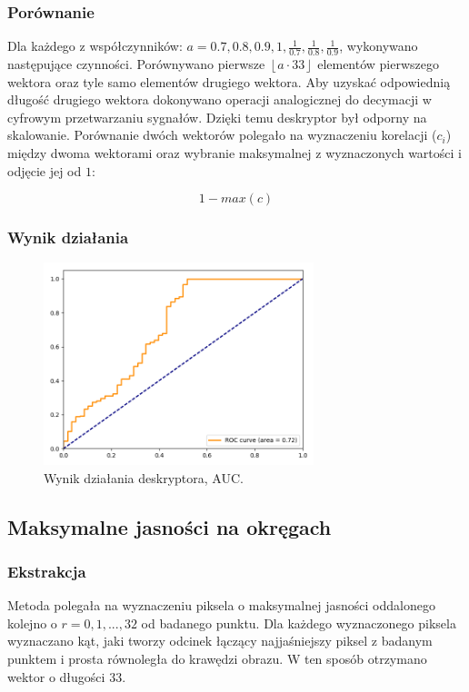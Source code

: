 \documentclass[a4paper,11pt]{article}
\begin{document}
\subsubsection{Porównanie}
Dla każdego z współczynników: $a = 0.7, 0.8, 0.9, 1, \frac{1}{0.7}, \frac{1}{0.8}, \frac{1}{0.9}$, wykonywano następujące czynności.
Porównywano pierwsze $\left \lfloor  a \cdot 33 \right \rfloor$ elementów pierwszego wektora oraz tyle samo elementów drugiego wektora. Aby uzyskać odpowiednią długość drugiego wektora dokonywano operacji analogicznej do decymacji w cyfrowym przetwarzaniu sygnałów.
Dzięki temu deskryptor był odporny na skalowanie.
Porównanie dwóch wektorów polegało na wyznaczeniu korelacji ($c_i$) między dwoma wektorami oraz wybranie maksymalnej z wyznaczonych wartości i odjęcie jej od $1$:

$$ 1-max(c) $$

\subsubsection{Wynik działania}

\begin{figure}[H]
\begin{center}
\includegraphics[width=0.7\textwidth]{./img/circle_hist.png}
\end{center}
\caption{Wynik działania deskryptora, AUC.}
\end{figure}

\subsection{Maksymalne jasności na okręgach}

\subsubsection{Ekstrakcja}
Metoda polegała na wyznaczeniu piksela o maksymalnej jasności oddalonego kolejno o $r = 0,1,...,32$ od badanego punktu.
Dla każdego wyznaczonego piksela wyznaczano kąt, jaki tworzy odcinek łączący najjaśniejszy piksel z badanym punktem i prosta równoległa do krawędzi obrazu. 
W ten sposób otrzymano wektor o długości $33$.
\end{document}
